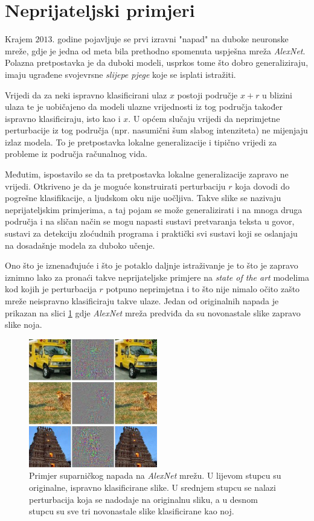 \documentclass[utf8, diplomski]{fer}
\begin{document}
\section{Neprijateljski primjeri}
Krajem $2013.$ godine pojavljuje se prvi izravni "napad" na duboke neuronske mreže\citep{Szegedy2014IntriguingPO}, gdje je jedna od meta bila prethodno spomenuta uspješna mreža \textit{AlexNet}. Polazna pretpostavka je da duboki modeli, usprkos tome što dobro generaliziraju, imaju ugrađene svojevrsne \textit{slijepe pjege} koje se isplati istražiti.
\par
Vrijedi da za neki ispravno klasificirani ulaz $x$ postoji područje $x + r$ u blizini ulaza te je uobičajeno da modeli ulazne vrijednosti iz tog područja također ispravno klasificiraju, isto kao i $x$. U općem slučaju vrijedi da neprimjetne perturbacije iz tog područja (npr. nasumični šum slabog intenziteta) ne mijenjaju izlaz modela. To je pretpostavka lokalne generalizacije i tipično vrijedi za probleme iz područja računalnog vida.
\par
Međutim, ispostavilo se da ta pretpostavka lokalne generalizacije zapravo ne vrijedi. Otkriveno je da je moguće konstruirati perturbaciju $r$ koja dovodi do pogrešne klasifikacije, a ljudskom oku nije uočljiva. Takve slike se nazivaju neprijateljskim primjerima, a taj pojam se može generalizirati i na mnoga druga područja i na sličan način se mogu napasti sustavi pretvaranja teksta u govor, sustavi za detekciju zloćudnih programa i praktički svi sustavi koji se oslanjaju na dosadašnje modela za duboko učenje. 
\par
Ono što je iznenađujuće i što je potaklo daljnje istraživanje je to što je zapravo iznimno lako za pronaći takve neprijateljske primjere na \textit{state of the art} modelima kod kojih je perturbacija $r$ potpuno neprimjetna i to što nije nimalo očito zašto mreže neispravno klasificiraju takve ulaze. Jedan od originalnih napada je prikazan na slici \ref{fig:alexnet_adv} gdje \textit{AlexNet} mreža predviđa da su novonastale slike zapravo slike noja.

\begin{figure}[H]
\centering
\includegraphics[width=0.5\textwidth,keepaspectratio]{img/other/alexnet_adv.jpg}
\caption{Primjer suparničkog napada na \textit{AlexNet} mrežu\citep{Szegedy2014IntriguingPO}. U lijevom stupcu su originalne, ispravno klasificirane slike. U srednjem stupcu se nalazi perturbacija koja se nadodaje na originalnu sliku, a u desnom stupcu su sve tri novonastale slike klasificirane kao noj.}
\label{fig:alexnet_adv}
\end{figure}
\end{document}
